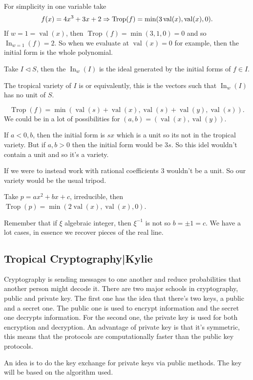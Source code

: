 \documentclass[12pt]{memoir}
\DeclareMathOperator{\val}{val}
\DeclareMathOperator{\Trop}{Trop}
\begin{document}
\begin{Ex}
    For simplicity in one variable take 
    $$f(x)=4x^3+3x+2\To\Trop(f)=\min(3\val(x),\val(x),0).$$
    If $w=1=\val(x)$, then $\Trop(f)=\min(3,1,0)=0$ and so $\operatorname*{In}_{w=1}(f)=2$. So when we evaluate at $\val(x)=0$ for example, then the initial form is the whole polynomial.
\end{Ex}

\begin{Def}
    Take $I\triangleleft S$, then the  $\operatorname{In}_w(I)$ is the ideal generated by the initial forms of $f\in I$.
\end{Def}

\begin{Def}
    The tropical variety of $I$ is 
    or equivalently, this is the vectors such that $\operatorname{In}_w(I)$ has no unit of $S$.
\end{Def}

\begin{Ex}
    $$\Trop(f)=\min(\val(s)+\val(x),\val(s)+\val(y),\val(s)).$$
    We could be in a lot of possibilities for $(a,b)=(\val(x),\val(y))$.\par 
    If $a<0,b$, then the initial form is $sx$ which is a unit so its not in the tropical variety. But if $a,b>0$ then the initial form would be $3s$. So this idel wouldn't contain a unit and so it's a variety. \par 
    If we were to instead work with rational coefficients $3$ wouldn't be a unit. So our variety would be the usual tripod.
\end{Ex}

\begin{Ex}
    Take $p=ax^2+bx+c$, irreducible, then $\Trop(p)=\min(2\val(x),\val(x),0)$.
\end{Ex}

Remember that if $\xi$ algebraic integer, then $\xi^{-1}$ is not so $b=\pm 1=c$. We have a lot cases, in essence we recover pieces of the real line.

\subsection{Tropical Cryptography|Kylie}

Cryptography is sending messages to one another and reduce probabilities that another person might decode it. There are two major schools in cryptography, public and private key. The first one has the idea that there's two keys, a public and a secret one. The public one is used to encrypt information and the secret one decrypts information. For the second one, the private key is used for both encryption and decryption. An advantage of private key is that it's symmetric, this means that the protocols are computationally faster than the public key protocols.\par 
An idea is to do the key exchange for private keys via public methods. The key will be based on the algorithm used.
\end{document}
